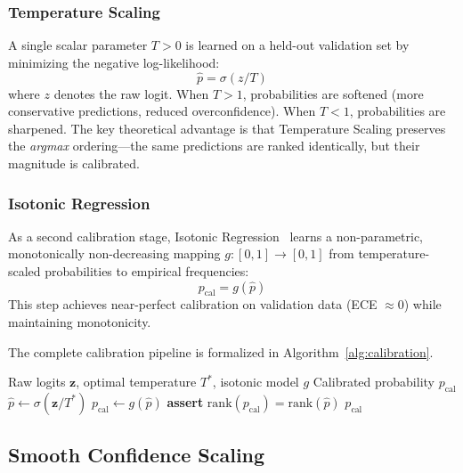 \documentclass[conference]{IEEEtran}
\begin{document}
\subsubsection{Temperature Scaling}
A single scalar parameter $T > 0$ is learned on a held-out validation set by minimizing the negative log-likelihood:
\begin{equation}
    \hat{p} = \sigma(z / T)
    \label{eq:temp}
\end{equation}
where $z$ denotes the raw logit. When $T > 1$, probabilities are softened (more conservative predictions, reduced overconfidence). When $T < 1$, probabilities are sharpened. The key theoretical advantage is that Temperature Scaling preserves the \textit{argmax} ordering---the same predictions are ranked identically, but their magnitude is calibrated.

\subsubsection{Isotonic Regression}
As a second calibration stage, Isotonic Regression~\cite{zadrozny2002} learns a non-parametric, monotonically non-decreasing mapping $g: [0,1] \to [0,1]$ from temperature-scaled probabilities to empirical frequencies:
\begin{equation}
    p_{\text{cal}} = g(\hat{p})
\end{equation}
This step achieves near-perfect calibration on validation data (ECE $\approx 0$) while maintaining monotonicity.

The complete calibration pipeline is formalized in Algorithm~\ref{alg:calibration}.

\begin{algorithm}[t]
\caption{Multi-Stage Calibration Pipeline}
\label{alg:calibration}
\begin{algorithmic}[1]
\Require Raw logits $\mathbf{z}$, optimal temperature $T^*$, isotonic model $g$
\Ensure Calibrated probability $p_{\text{cal}}$
\State $\hat{p} \gets \sigma(\mathbf{z} / T^*)$ 
\State $p_{\text{cal}} \gets g(\hat{p})$ 
\State \textbf{assert} $\text{rank}(p_{\text{cal}}) = \text{rank}(\hat{p})$ 
\State \Return $p_{\text{cal}}$
\end{algorithmic}
\end{algorithm}

\subsection{Smooth Confidence Scaling}
\end{document}
